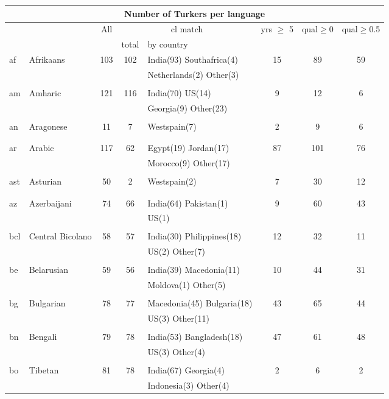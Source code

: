 \begin{figure}[h]
\centering
\begin{tabular}{llcclccc}
\multicolumn{8}{c}{Number of Turkers per language}\\
\hline\hline
&&All&\multicolumn{2}{c}{cl match}&yrs $\geq$ 5&qual$\geq$0&qual$\geq$0.5\\
&&&total&by country&&\\
\hline\hline
af&Afrikaans&103&102&India(93) Southafrica(4) &15&89&59\\
&&&&Netherlands(2) Other(3) &&&\\
&&&&&&&\\
am&Amharic&121&116&India(70) US(14) &9&12&6\\
&&&&Georgia(9) Other(23) &&&\\
&&&&&&&\\
an&Aragonese&11&7&Westspain(7) &2&9&6\\
&&&&&&&\\
&&&&&&&\\
ar&Arabic&117&62&Egypt(19) Jordan(17) &87&101&76\\
&&&&Morocco(9) Other(17) &&&\\
&&&&&&&\\
ast&Asturian&50&2&Westspain(2) &7&30&12\\
&&&&&&&\\
&&&&&&&\\
az&Azerbaijani&74&66&India(64) Pakistan(1) &9&60&43\\
&&&&US(1) &&&\\
&&&&&&&\\
bcl&Central Bicolano&58&57&India(30) Philippines(18) &12&32&11\\
&&&&US(2) Other(7) &&&\\
&&&&&&&\\
be&Belarusian&59&56&India(39) Macedonia(11) &10&44&31\\
&&&&Moldova(1) Other(5) &&&\\
&&&&&&&\\
bg&Bulgarian&78&77&Macedonia(45) Bulgaria(18) &43&65&44\\
&&&&US(3) Other(11) &&&\\
&&&&&&&\\
bn&Bengali&79&78&India(53) Bangladesh(18) &47&61&48\\
&&&&US(3) Other(4) &&&\\
&&&&&&&\\
bo&Tibetan&81&78&India(67) Georgia(4) &2&6&2\\
&&&&Indonesia(3) Other(4) &&&\\

\end{tabular}
\end{figure}
